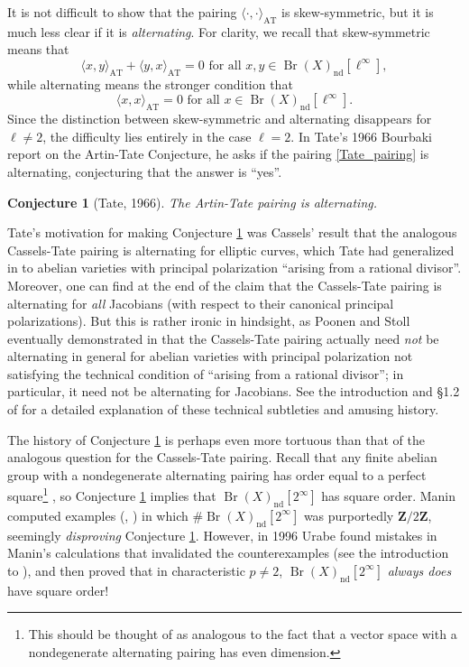 \documentclass[10pt, reqno]{amsart}
\numberwithin{equation}{subsection}
\newcommand{\Z}{\mathbf{Z}}
\newcommand{\mrm}[1]{\mathrm{#1}}
\DeclareMathOperator{\Br}{Br}
\DeclareMathOperator{\nd}{nd}
\newtheorem{conj}[thm]{Conjecture}
\theoremstyle{remark}
\begin{document}
	
It is not difficult to show that the pairing $\langle  \cdot, \cdot \rangle_{\mrm{AT}} $ is skew-symmetric, but it is much less clear if it is \emph{alternating}. For clarity, we recall that skew-symmetric means that
\[ 
\langle x,y \rangle_{\mrm{AT}} + \langle y,x \rangle_{\mrm{AT}} = 0 \text{ for all } x,y \in \Br(X)_{\nd}[\ell^{\infty}] ,
\]
while alternating means the stronger condition that
\[
\langle x,x \rangle_{\mrm{AT}} = 0 \text{ for all } x \in \Br(X)_{\nd}[\ell^{\infty}] . 
\]
Since the distinction between skew-symmetric and alternating disappears for $\ell \neq 2$, the difficulty lies entirely in the case $\ell = 2$. In Tate's 1966 Bourbaki report on the Artin-Tate Conjecture, he asks \cite[after Theorem 5.1]{Tate66} if the pairing \eqref{Tate_pairing} is alternating, conjecturing that the answer is ``yes''.


\begin{conj}[Tate, 1966] \label{conj: Tate}
The Artin-Tate pairing is alternating. 
\end{conj}

Tate's motivation for making Conjecture \ref{conj: Tate} was Cassels' result \cite{Ca65} that the analogous Cassels-Tate pairing is alternating for elliptic curves, which Tate had generalized in \cite{Tate62} to abelian varieties with principal polarization ``arising from a rational divisor''. Moreover, one can find at the end of \cite[\S 1]{Tate66} the claim that the Cassels-Tate pairing is alternating for \emph{all} Jacobians (with respect to their canonical principal polarizations). But this is rather ironic in hindsight, as Poonen and Stoll eventually demonstrated in \cite{PS99} that the Cassels-Tate pairing actually need \emph{not} be alternating in general for abelian varieties with principal polarization not satisfying the technical condition of ``arising from a rational divisor''; in particular, it need not be alternating for Jacobians. See the introduction and \S 1.2 of \cite{Sher} for a detailed explanation of these technical subtleties and amusing history.
	
The history of Conjecture \ref{conj: Tate} is perhaps even more tortuous than that of the analogous question for the Cassels-Tate pairing. Recall that any finite abelian group with a nondegenerate alternating pairing has order equal to a perfect square\footnote{This should be thought of as analogous to the fact that a vector space with a nondegenerate alternating pairing has even dimension.} \cite[\S 6]{PS99}, so Conjecture \ref{conj: Tate} implies that $\Br(X)_{\nd}[2^{\infty}]$ has square order. Manin computed examples (\cite{Manin67}, \cite{Manin86}) in which $\# \Br(X)_{\nd}[2^{\infty}]$ was purportedly $\Z/2\Z$, seemingly \emph{disproving} Conjecture \ref{conj: Tate}. However, in 1996 Urabe found mistakes in Manin's calculations that invalidated the counterexamples (see the introduction to \cite{Urabe96}), and then proved that in characteristic $p \neq 2$, $\Br(X)_{\nd}[2^{\infty}]$ \emph{always does} have square order! 
\end{document}
